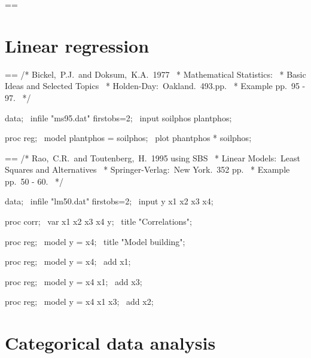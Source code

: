 \documentclass{book}
\makeatletter
\newenvironment{Texinfopreformatted}{%
  \par\GNUTobeylines\obeyspaces\frenchspacing\parskip=\z@\parindent=\z@}{}
{\catcode`\^^M=13 \gdef\GNUTobeylines{\catcode`\^^M=13 \def^^M{\null\par}}}
\newenvironment{Texinfoindented}{\begin{list}{}{}\item\relax}{\end{list}}
\renewcommand{\_}{\Texinfounderscore\discretionary{}{}{}}
\makeatother
\begin{document}
\begin{Texinfoindented}
\begin{Texinfopreformatted}
\end{Texinfopreformatted}
\end{Texinfoindented}


\section{{Linear regression}}
\label{anchor:Linear-regression-examples}%
%
%

\begin{Texinfoindented}
\begin{Texinfopreformatted}%
\ttfamily /* Bickel,\ P.J.\ and Doksum,\ K.A.\ 1977
\ * Mathematical Statistics:
\ * Basic Ideas and Selected Topics
\ * Holden-Day:\ Oakland.\ 493.pp.
\ * Example pp.\ 95 - 97.
\ */

data;
\  infile "ms95.dat" firstobs=2;
\  input soilphos plantphos;

proc reg;
\ model plantphos = soilphos;
\ plot phantphos * soilphos;


\end{Texinfopreformatted}
\end{Texinfoindented}

\begin{Texinfoindented}
\begin{Texinfopreformatted}%
\ttfamily /* Rao,\ C.R.\ and Toutenberg,\ H.\ 1995 using SBS
\ * Linear Models:\ Least Squares and Alternatives
\ * Springer-Verlag:\ New York.\ 352 pp.
\ * Example pp.\ 50 - 60.
\ */

data;
\  infile "lm50.dat" firstobs=2;
\  input y x1 x2 x3 x4;

proc corr;
\ var x1 x2 x3 x4 y;
\ title "Correlations";

proc reg;
\ model y = x4;
\ title "Model building";

proc reg;
\ model y = x4;
\ add x1;

proc reg;
\ model y = x4 x1;
\ add x3;

proc reg;
\ model y = x4 x1 x3;
\ add x2;

\end{Texinfopreformatted}
\end{Texinfoindented}

\section{{Categorical data analysis}}
\label{anchor:Categorical-data-analysis-examples}%
%
%
%
%
%
%
%
%
\end{document}
